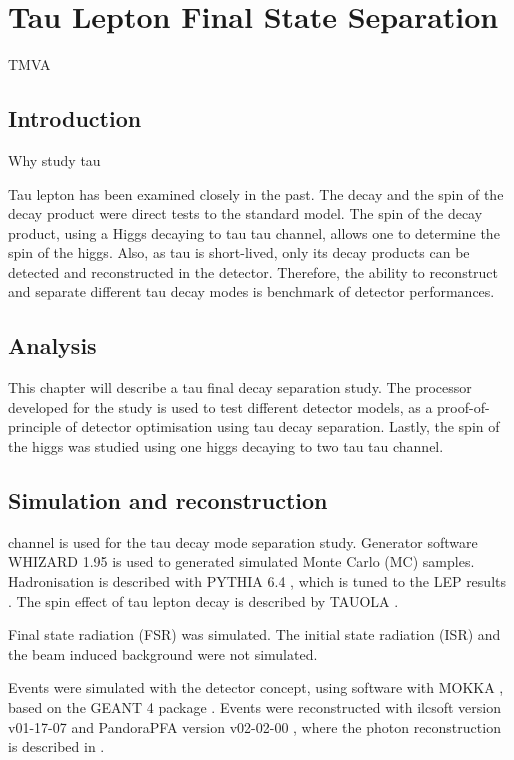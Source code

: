 \chapter{Tau Lepton Final State Separation}
\label{chap:Tau}

%
{TMVA}%


\section{Introduction}

Why study tau

Tau lepton has been examined closely in the past. The decay and the spin of the decay product were direct tests to the standard model. The spin of the decay product, using a Higgs decaying to tau tau channel, allows one to determine the spin of the higgs. Also, as tau is short-lived, only its decay products can be detected and reconstructed in the detector. Therefore, the ability to reconstruct and separate different tau decay modes is benchmark of detector performances.

\section{Analysis}

This chapter will describe a tau final decay separation study. The processor developed for the study is used to test different detector models, as a proof-of-principle of detector optimisation using tau decay separation. Lastly, the spin of the higgs was studied using one higgs decaying to two tau tau channel.


\section{Simulation and reconstruction}

\eeToTauTau channel is used for the tau decay mode separation study. Generator software WHIZARD 1.95 \cite{whizard} is used to generated simulated Monte Carlo (MC) samples. Hadronisation is described with PYTHIA 6.4 \cite{Sjostrand:1995iq}, which is tuned to the LEP results \cite{}. The spin effect of tau lepton decay is described by TAUOLA \cite{Jadach:1993hs}.

Final state radiation (FSR) was simulated. The initial state radiation (ISR) and the beam induced background were not simulated.

Events were simulated with the \CLICILD detector concept, using software with MOKKA \cite{MoradeFreitas:2002kj}, based on the GEANT 4 package  \cite{Agostinelli:2002hh}.
Events were reconstructed with  ilcsoft version v01-17-07 \cite{Gaede:82475} and PandoraPFA version v02-02-00 \cite{Marshall:2015rfa}, where the photon reconstruction is described in \cite{Xu:2016rcz}.

